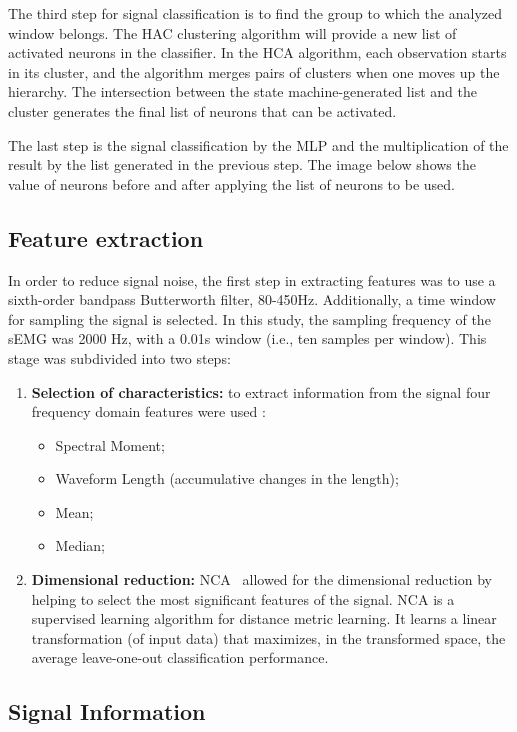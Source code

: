 \documentclass[letterpaper, 10 pt, conference]{ieeeconf}  %
\begin{document}
The third step for signal classification is to find the group to which the analyzed window belongs. The HAC clustering
algorithm will provide a new list of activated neurons in the classifier. In the HCA algorithm, each observation starts in its cluster, and the algorithm merges pairs of clusters when one moves up the hierarchy. The intersection between the state machine-generated list and the cluster generates the final list of neurons that can be activated.

The last step is the signal classification by the MLP and the multiplication of the result by the list generated in the previous step. The image below shows the value of neurons before and after applying the list of neurons to be used.

\subsection{Feature extraction}

In order to reduce signal noise, the first step in extracting features was to use a sixth-order bandpass Butterworth filter, 80-450Hz. Additionally, a time window for sampling the signal is selected. In this study, the sampling frequency of the sEMG was 2000 Hz, with a 0.01s window (i.e., ten samples per window).
This stage was subdivided into two steps:
\begin{enumerate}
    \item \textbf{Selection of characteristics:} to extract information from the signal four frequency domain features were used \cite{c9}:
        \begin{itemize}
            \item Spectral Moment;
            \item Waveform Length (accumulative changes in the length);
            \item Mean;
            \item Median;
        \end{itemize}
   \item \textbf{Dimensional reduction:} NCA~\cite{c10} allowed for the dimensional reduction by helping to select the most significant features of the signal. NCA is a supervised learning algorithm for distance metric learning. It learns a linear transformation (of input data) that maximizes, in the transformed space, the average leave-one-out classification performance. 
\end{enumerate}

\subsection{Signal Information}
\end{document}
